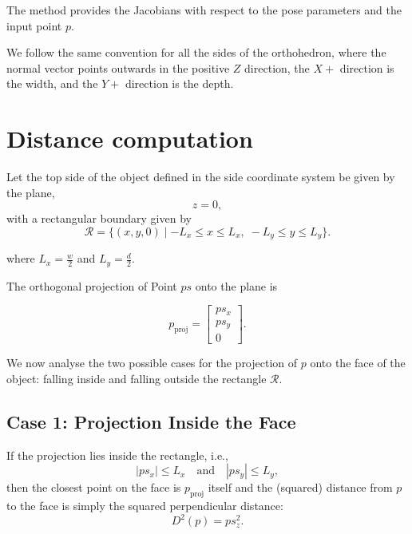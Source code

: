 \documentclass[11pt]{article}
\begin{document}
    The method provides the Jacobians with respect to the pose parameters and the input point \(p\).

    We follow the same convention for all the sides of the orthohedron, where the normal vector points outwards in the positive $Z$ direction, the $X+$ direction is the width, and the $Y+$ direction is the depth.

    \section*{Distance computation}

    Let the top side of the object defined in the side coordinate system be given by the plane,
    \begin{equation}
        z = 0,
    \end{equation}
    with a rectangular boundary given by
    \begin{equation}
        \mathcal{R} = \{ (x,y,0) \mid -L_x \le x \le L_x,\; -L_y \le y \le L_y \}.
    \end{equation}

    where \(L_x = \frac{w}{2}\) and \(L_y = \frac{d}{2}\).

    The orthogonal projection of Point $ps$ onto the plane is

    \begin{equation}
        p_{\text{proj}} = \begin{bmatrix} ps_x \\ ps_y \\ 0 \end{bmatrix}.
    \end{equation}

    We now analyse the two possible cases for the projection of \(p\) onto the face of the object: falling inside and falling outside the rectangle \(\mathcal{R}\).

    \subsection*{Case 1: Projection Inside the Face}

        If the projection lies inside the rectangle, i.e.,
        \begin{equation}
            |ps_x| \le L_x \quad \text{and} \quad |ps_y| \le L_y,
        \end{equation}
        then the closest point on the face is \(p_{\text{proj}}\) itself and the (squared) distance from \(p\) to the face is simply the squared perpendicular distance:
        \begin{equation}
            D^2(p) = ps^2_z.
        \end{equation}
\end{document}
